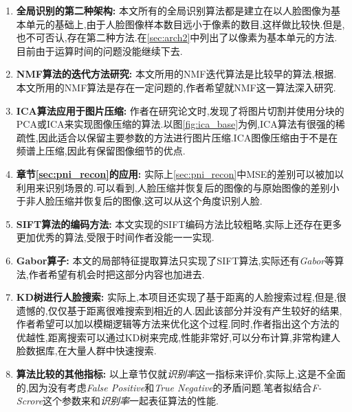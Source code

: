 \begin{enumerate}

\item \textbf{全局识别的第二种架构: }
本文所有的全局识别算法都是建立在以人脸图像为基本单元的基础上,由于人脸图像样本数目远小于像素的数目,这样做比较快.但是,也不可否认,存在第二种方法.在\ref{sec:arch2}中列出了以像素为基本单元的方法.目前由于运算时间的问题没能继续下去.

\item \textbf{NMF算法的迭代方法研究: }
本文所用的NMF迭代算法是比较早的算法,根据\cite{lin2007projected}. 本文所用的NMF算法是存在一定问题的,作者希望就NMF这一算法深入研究.

\item \textbf{ICA算法应用于图片压缩: }
作者在研究论文时,发现了将图片切割并使用分块的PCA或ICA来实现图像压缩的算法.以图\ref{fig:ica_base}为例,ICA算法有很强的稀疏性,因此适合以保留主要参数的方法进行图片压缩.ICA图像压缩由于不是在频谱上压缩,因此有保留图像细节的优点.

\item \textbf{章节\ref{sec:pni_recon}的应用: }
实际上\ref{sec:pni_recon}中MSE的差别可以被加以利用来识别场景的.可以看到,人脸压缩并恢复后的图像的与原始图像的差别小于非人脸压缩并恢复后的图像,这可以从这个角度识别人脸.

\item \textbf{SIFT算法的编码方法: }
本文实现的SIFT编码方法比较粗略,实际上还存在更多更加优秀的算法,受限于时间作者没能一一实现.

\item \textbf{Gabor算子: }
本文的局部特征提取算法只实现了SIFT算法,实际还有\textit{Gabor}等算法,作者希望有机会时把这部分内容也加进去.

\item \textbf{KD树进行人脸搜索: }
实际上,本项目还实现了基于距离的人脸搜索过程,但是,很遗憾的,仅仅基于距离很难搜索到相近的人.因此该部分并没有产生较好的结果,作者希望可以加以模糊逻辑等方法来优化这个过程.同时,作者指出这个方法的优越性,距离搜索可以通过KD树来完成,性能非常好,可以分布计算,非常构建人脸数据库,在大量人群中快速搜索.

\item \textbf{算法比较的其他指标: }
以上章节仅就\textit{识别率}这一指标来评价,实际上,这是不全面的,因为没有考虑\textit{False Positive}和\textit{True Negative}的矛盾问题.笔者拟结合\textit{F-Scrore}这个参数来和\textit{识别率}一起表征算法的性能.

\end{enumerate}
